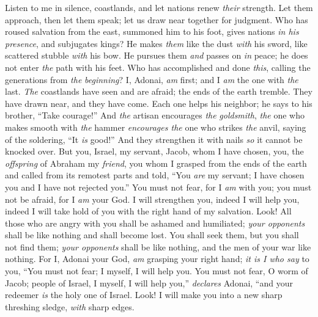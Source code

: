 \begin{biblechapter} %
 Listen to me in silence, coastlands, 
and let nations renew \textit{their} strength. 
Let them approach, then let them speak; 
let us draw near together for judgment.
\verse Who has roused salvation from the east, 
summoned him to his foot, 
gives nations \textit{in his presence}, 
and subjugates kings? 
He makes \textit{them} like the dust \textit{with} his sword, 
like scattered stubble \textit{with} his bow.
\verse He pursues them \textit{and} passes on \textit{in} peace; 
he does not enter \textit{the} path with his feet.
\verse Who has accomplished and done \textit{this}, 
calling the generations from \textit{the} \textit{beginning}? 
I, Adonai, \textit{am} first; 
and I \textit{am} the one with \textit{the} last.
\verse \textit{The} coastlands have seen and are afraid; 
the ends of the earth tremble. 
They have drawn near, 
and they have come.
\verse Each one helps his neighbor; 
he says to his brother, “Take courage!”
\verse And \textit{the} artisan encourages \textit{the} \textit{goldsmith}, 
\textit{the} one who makes smooth with \textit{the} hammer \textit{encourages the} one who strikes \textit{the} anvil, 
saying of the soldering, “It \textit{is} good!” 
And they strengthen it with nails \textit{so} it cannot be knocked over.
\verse But you, Israel, my servant, Jacob, whom I have chosen, 
you, the \textit{offspring} of Abraham my \textit{friend},
\verse you whom I grasped from the ends of the earth 
and called from its remotest parts 
and told, “You \textit{are} my servant; 
I have chosen you and I have not rejected you.”
\verse You must not fear, for I \textit{am} with you; 
you must not be afraid, for I \textit{am} your God. 
I will strengthen you, indeed I will help you, 
indeed I will take hold of you with the right hand of my salvation.
\verse Look! All those who are angry with you shall be ashamed and humiliated; 
\textit{your opponents} shall be like nothing and shall become lost.
\verse You shall seek them, 
but you shall not find them; 
\textit{your opponents} shall be like nothing, 
and the men of your war like nothing.
\verse For I, Adonai your God, \textit{am} grasping your right hand; 
\textit{it is I who say} to you, 
“You must not fear; 
I myself, I will help you.
\verse You must not fear, O worm of Jacob; 
people of Israel, 
I myself, I will help you,” \textit{declares} Adonai, 
“and your redeemer \textit{is} the holy one of Israel.
\verse Look! I will make you into a new sharp threshing sledge, 
\textit{with} sharp edges. 

\end{biblechapter}
